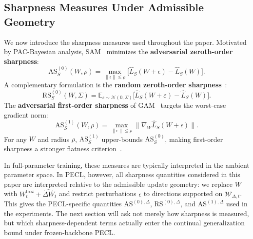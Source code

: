\subsection{Sharpness Measures Under Admissible Geometry}
\label{section:sahrpness}

We now introduce the sharpness measures used throughout the paper.
Motivated by PAC-Bayesian analysis, SAM~\citep{foretSharpnessAwareMinimizationEfficiently2021} minimizes the \textbf{adversarial zeroth-order sharpness}:
\[
\mathrm{AS}^{(0)}_S(W,\rho) = \max_{\|\epsilon\| \leq \rho} \bigl[\hat{L}_S(W+\epsilon) - \hat{L}_S(W)\bigr].
\]
A complementary formulation is the \textbf{random zeroth-order sharpness}~\citep{pmlr-v151-bisla22a,jiang2019fantasticgeneralizationmeasures}:
\[
\mathrm{RS}_S^{(0)}(W, \Sigma) = \mathbb{E}_{\varepsilon \sim \mathcal{N}(0,\Sigma)} \bigl[\hat{L}_S(W+\varepsilon) - \hat{L}_S(W)\bigr].
\]
The \textbf{adversarial first-order sharpness} of GAM~\citep{Zhang_GAM} targets the worst-case gradient norm:
\[
\mathrm{AS}^{(1)}_S(W,\rho) = \max_{\|\epsilon\| \leq \rho} \|\nabla_W \hat{L}_S(W+\epsilon)\|.
\]
For any $W$ and radius $\rho$, $\mathrm{AS}^{(1)}_S$ upper-bounds $\mathrm{AS}^{(0)}_S$, making first-order sharpness a stronger flatness criterion~\citep{Zhang_GAM}.

In full-parameter training, these measures are typically interpreted in the ambient parameter space.
In PECL, however, all sharpness quantities considered in this paper are interpreted relative to the admissible update geometry: we replace $W$ with $W_t^{\mathrm{froz}} + \widehat{\Delta W}_t$ and restrict perturbations $\epsilon$ to directions supported on $\mathcal{W}_{\Delta,t}$.
This gives the PECL-specific quantities $\mathrm{AS}^{(0),\Delta}$, $\mathrm{RS}^{(0),\Delta}$, and $\mathrm{AS}^{(1),\Delta}$ used in the experiments.
The next section will ask not merely how sharpness is measured, but which sharpness-dependent terms actually enter the continual generalization bound under frozen-backbone PECL.
